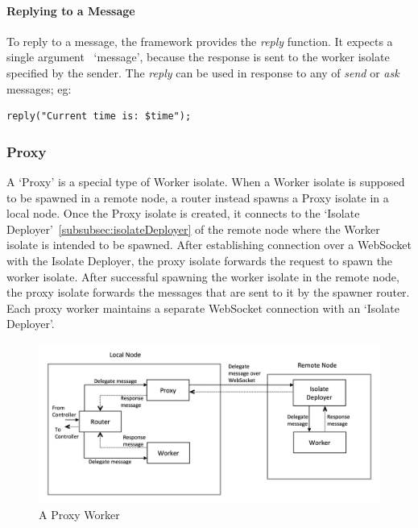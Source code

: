   \paragraph{Replying to a Message}
  \label{subsec:replyMessage}

  To reply to a message, the framework provides the \emph{reply} function. It expects a single argument~\textemdash{} ‘message’, because the response is sent to the worker isolate specified by the sender. The \emph{reply} can be used in response to any of \emph{send} or \emph{ask} messages; eg:
\begin{lstlisting}[numbers=none]
  reply("Current time is: $time");
\end{lstlisting}

  \subsubsection{Proxy}
  A ‘Proxy’ is a special type of Worker isolate. When a Worker isolate is supposed to be spawned in a remote node, a router instead spawns a Proxy isolate in a local node. Once the Proxy isolate is created, it connects to the ‘Isolate Deployer’~\autoref{subsubsec:isolateDeployer} of the remote node where the Worker isolate is intended to be spawned. After establishing connection over a WebSocket with the Isolate Deployer, the proxy isolate forwards the request to spawn the worker isolate. After successful spawning the worker isolate in the remote node, the proxy isolate forwards the messages that are sent to it by the spawner router. Each proxy worker maintains a separate WebSocket connection with an ‘Isolate Deployer’.\\

  \begin{figure}[H]
    \centering
    \includegraphics[width=1\textwidth]{figures/proxy}
    \caption[Proxy Worker]{A Proxy Worker}
    \label{fig:proxy}
  \end{figure}

